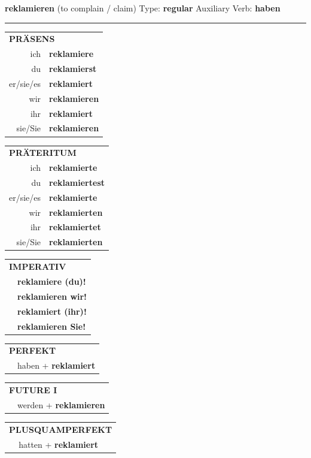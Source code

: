 \documentclass[10pt,a4paper]{revtex4-2}
\begin{document}
\begin{verbbox}
{\Large \bf reklamieren} (to complain / claim) \hfill Type: \textbf{regular} \hfill Auxiliary Verb: \textbf{haben}

\vspace{5pt}
\hrule
\vspace{5pt}

\begin{tabular}{rl}
\multicolumn{2}{l}{\textbf{PRÄSENS}}\\
ich & \textbf{reklamiere}\\
du & \textbf{reklamierst}\\
er/sie/es & \textbf{reklamiert}\\
wir & \textbf{reklamieren}\\
ihr & \textbf{reklamiert}\\
sie/Sie & \textbf{reklamieren}\\
\end{tabular}
\hfill
\begin{tabular}{rl}
\multicolumn{2}{l}{\textbf{PRÄTERITUM}}\\
ich & \textbf{reklamierte}\\
du & \textbf{reklamiertest}\\
er/sie/es & \textbf{reklamierte}\\
wir & \textbf{reklamierten}\\
ihr & \textbf{reklamiertet}\\
sie/Sie & \textbf{reklamierten}\\
\end{tabular}
\hfill
\begin{tabular}{rl}
\multicolumn{2}{l}{\textbf{IMPERATIV}}\\
& \textbf{reklamiere (du)!}\\
& \textbf{reklamieren wir!}\\
& \textbf{reklamiert (ihr)!}\\
& \textbf{reklamieren Sie!}\\
\end{tabular}

\vspace{10pt}

\begin{tabular}{rl}
\multicolumn{2}{l}{\textbf{PERFEKT}}\\
& haben + \textbf{reklamiert}\\
\end{tabular}
\hfill
\begin{tabular}{rl}
\multicolumn{2}{l}{\textbf{FUTURE I}}\\
& werden + \textbf{reklamieren}\\
\end{tabular}
\hfill
\begin{tabular}{rl}
\multicolumn{2}{l}{\textbf{PLUSQUAMPERFEKT}}\\
& hatten + \textbf{reklamiert}\\
\end{tabular}


\end{verbbox}
\end{document}
